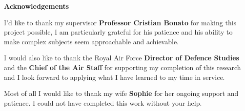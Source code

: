 \vspace*{\fill}
\begin{center}
{\rmfamily\bfseries\Huge Acknowledgements}

\vspace{2em}
I'd like to thank my supervisor \textbf{Professor Cristian Bonato} for
making this project possible, I am particularly grateful for his
patience and his ability to make complex subjects seem approachable and achievable. 

\bigskip 

I would also like to thank the Royal Air Force \textbf{Director of Defence Studies} and the \textbf{Chief of the Air Staff} 
for supporting my completion of this research and I look forward to applying what I have learned to my time in service. 


\bigskip 

Most of all I would like to thank my wife \textbf{Sophie} for her ongoing support and patience. I could not have completed this work without your help. 

\end{center}


\vspace*{\fill}
%
%
%
%
%
%
